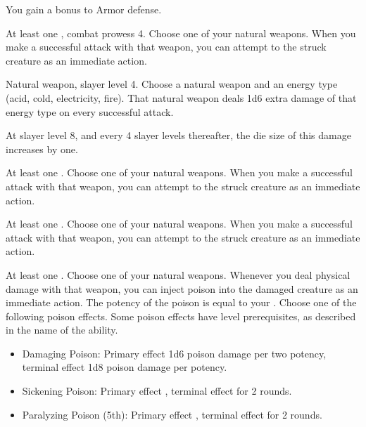    \featben You gain a  bonus to Armor defense.

    \featpre At least one , combat prowess 4.
    \featben Choose one of your natural weapons.
    When you make a successful attack with that weapon, you can attempt to  the struck creature as an immediate action.

    \featpre Natural weapon, slayer level 4.
    \featben Choose a natural weapon and an energy type (acid, cold, electricity, fire).
    That natural weapon deals 1d6 extra damage of that energy type on every successful attack.

    At slayer level 8, and every 4 slayer levels thereafter, the die size of this damage increases by one.

    \featpre At least one .
    \featben Choose one of your natural weapons.
    When you make a successful attack with that weapon, you can attempt to  the struck creature as an immediate action.

    \featpre At least one .
    \featben Choose one of your natural weapons.
    When you make a successful attack with that weapon, you can attempt to  the struck creature as an immediate action.

    \featpre At least one .
    \featben Choose one of your natural weapons.
    Whenever you deal physical damage with that weapon, you can inject poison into the damaged creature as an immediate action.
    The potency of the poison is equal to your .
    Choose one of the following poison effects.
    Some poison effects have level prerequisites, as described in the name of the ability.
    \begin{itemize}
        \item Damaging Poison: Primary effect 1d6 poison damage per two potency, terminal effect 1d8 poison damage per potency.
        \item Sickening Poison: Primary effect \sickened, terminal effect \nauseated for 2 rounds.
        \item Paralyzing Poison (5th): Primary effect \immobilized, terminal effect \paralyzed for 2 rounds.
    \end{itemize}

